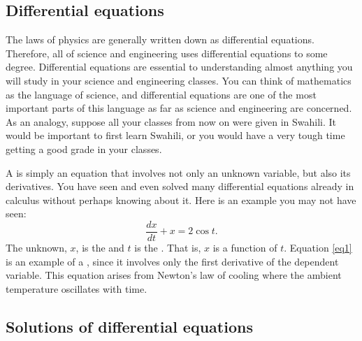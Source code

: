 
\subsection{Differential equations}

The laws of physics are generally written down as differential
equations.  Therefore, all of science and engineering uses
differential equations to some degree.
Differential equations are essential to understanding almost anything you will
study in your science and engineering classes.
You can think of mathematics as the language of science, and
differential equations are one of the most important parts of this
language as far as science and engineering are concerned.  As an analogy,
suppose all your classes from now on were given in Swahili.  
It would be important to first learn Swahili, or you would have a very
tough time getting a good grade in your classes.

A \emph{} is simply an equation that involves
not only an unknown variable, but also its derivatives.
You have seen and even solved many
differential equations already in calculus without perhaps knowing about it.
Here is an example you may not have seen:
\begin{equation} \label{eq1}
\frac{dx}{dt} + x = 2 \cos t .
\end{equation}
The unknown, $x$, is the \emph{} and $t$ is the
\emph{}.  That is, $x$ is a function of $t$.
Equation \eqref{eq1}
is an example of a \emph{}, since
it involves only the first derivative of the dependent variable.  This 
equation arises from Newton's law of cooling where the ambient
temperature oscillates with time.

\subsection{Solutions of differential equations}

